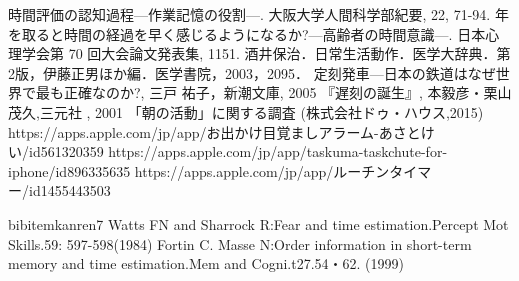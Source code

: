 \begin{thebibliography}{100}
時間評価の認知過程—作業記憶の役割—. 大阪大学人間科学部紀要, 22, 71-94.
年を取ると時間の経過を早く感じるようになるか?—高齢者の時間意識—. 日本心理学会第 70 回大会論文発表集, 1151.
%
酒井保治．日常生活動作．医学大辞典．第2版，伊藤正男ほか編．医学書院，2003，2095．
定刻発車—日本の鉄道はなぜ世界で最も正確なのか?, 三戸 祐子，新潮文庫, 2005
『遅刻の誕生』, 本毅彦・栗山茂久,三元社 , 2001
「朝の活動」に関する調査 (株式会社ドゥ・ハウス,2015)
https://apps.apple.com/jp/app/お出かけ目覚ましアラーム-あさとけい/id561320359
https://apps.apple.com/jp/app/taskuma-taskchute-for-iphone/id896335635
https://apps.apple.com/jp/app/ルーチンタイマー/id1455443503

bibitem{kanren7}
Watts FN and Sharrock R:Fear and time estimation.Percept Mot Skills.59: 597-598(1984)
Fortin C. Masse N:Order information in short-term memory and time estimation.Mem and Cogni.t27.54・62. (1999)

\end{thebibliography}


